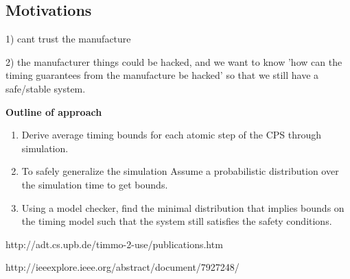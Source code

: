 




\subsection{Motivations}

1) cant trust the manufacture

2) the manufacturer things could be hacked, and we want to know 'how can the timing guarantees from the manufacture be hacked' so that we still have a safe/stable system.


\textbf{Outline of approach}

\begin{enumerate}
    \item Derive average timing bounds for each atomic step of the CPS through simulation.
    \item To safely generalize the simulation Assume a probabilistic distribution over the simulation time to get bounds.
    \item Using a model checker, find the minimal distribution that implies bounds on the timing model such that the system still satisfies the safety conditions.
\end{enumerate}


\iffalse

http://adt.cs.upb.de/timmo-2-use/publications.htm

http://ieeexplore.ieee.org/abstract/document/7927248/

